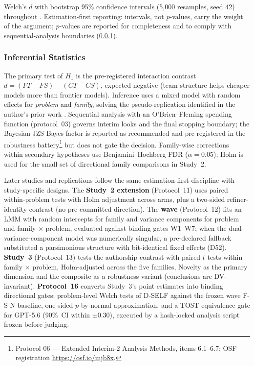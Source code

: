 \documentclass[12pt,a4paper]{article}
\begin{document}
Welch's $d$ with bootstrap 95\% confidence intervals (5{,}000 resamples, seed
42) throughout \citep{Lakens2013}. Estimation-first reporting: intervals, not
$p$-values, carry the weight of the argument; $p$-values are reported for
completeness and to comply with sequential-analysis boundaries
(\cref{sec:inferential}).

\subsubsection{Inferential Statistics}\label{sec:inferential}

The primary test of $H_1$ is the pre-registered interaction contrast
$d = (FT - FS) - (CT - CS)$, expected negative (team structure helps cheaper
models more than frontier models). Inference uses a mixed model with random
effects for \emph{problem} and \emph{family}, solving the pseudo-replication
identified in the author's
prior work \citep{Hariri2026b}. Sequential analysis with an O'Brien--Fleming
spending function (protocol~03) governs interim looks and the final stopping
boundary; the Bayesian JZS Bayes factor is reported as recommended and
pre-registered in the robustness battery\footnote{Protocol 06 --- Extended
Interim-2 Analysis Methods, items 6.1--6.7; OSF registration
\url{https://osf.io/mjb8x}.} but
does not gate the decision. Family-wise corrections within secondary hypotheses
use Benjamini--Hochberg FDR ($\alpha = 0.05$); Holm is used for the small set of
directional family comparisons in Study~2.

Later studies and replications follow the same estimation-first discipline with
study-specific designs. The \textbf{Study~2 extension} (Protocol~11) uses paired
within-problem tests with Holm adjustment across arms, plus a two-sided
refiner-identity contrast (no pre-committed direction). The \textbf{wave}
(Protocol~12) fits an LMM with random intercepts for family and variance
components for problem and family $\times$ problem, evaluated against binding
gates W1--W7; when the dual-variance-component model was numerically singular, a
pre-declared fallback substituted a parsimonious structure with bit-identical
fixed effects (D52). \textbf{Study~3} (Protocol~13) tests the authorship
contrast with paired $t$-tests within family $\times$ problem, Holm-adjusted
across the five families, Novelty as the primary dimension and the composite as
a robustness variant (conclusions are DV-invariant). \textbf{Protocol~16}
converts Study~3's point estimates into binding directional gates: problem-level
Welch tests of D-SELF against the frozen wave F-S-N baseline, one-sided $p$ by
normal approximation, and a TOST equivalence gate for GPT-5.6 (90\%~CI within
$\pm 0.30$), executed by a hash-locked analysis script frozen before judging.
\end{document}
